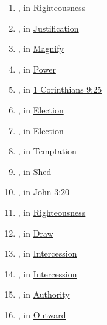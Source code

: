 \begin{enumerate}
		\item \hyperref[DIKAIOSUNE]{}, in \hyperref[RIGHTEOUSNESS]{Righteousness}
		
		\item \hyperref[DIKAIOSIS]{}, in \hyperref[JUSTIFICATION]{Justification}
		
		\item \hyperref[DOXAZO]{}, in \hyperref[MAGNIFY]{Magnify}
		
		\item \hyperref[DUNAMIS]{}, in \hyperref[POWER]{Power}
		
		\item \hyperref[EGKRATEUOMAI]{}, in \hyperref[1CORINTHIANS-9-25]{1 Corinthians 9:25}
		
		\item \hyperref[EKLEKTOS]{}, in \hyperref[ELECTION]{Election}
		
		\item \hyperref[EKLOGE]{}, in \hyperref[ELECTION]{Election}
		
		\item \hyperref[EKPEIRAZO]{}, in \hyperref[TEMPTATION]{Temptation}
		
		\item \hyperref[EKCHEO]{}, in \hyperref[SHED]{Shed}
		
		\item \hyperref[ELENCHO]{}, in \hyperref[JOHN-3-20]{John 3:20}
		
		\item \hyperref[ELEEMOSUNE]{}, in \hyperref[RIGHTEOUSNESS]{Righteousness}
		
		\item \hyperref[HELKO]{}, in \hyperref[DRAW]{Draw}
	
		\item \hyperref[ENTEUXIS]{}, in \hyperref[INTERCESSION]{Intercession}
	
		\item \hyperref[ENTUNCHANO]{}, in \hyperref[INTERCESSION]{Intercession}
		
		\item \hyperref[EXOUSIA]{}, in \hyperref[AUTHORITY]{Authority}
		
		\item \hyperref[EXO]{}, in \hyperref[OUTWARD]{Outward}
		

\end{enumerate}
